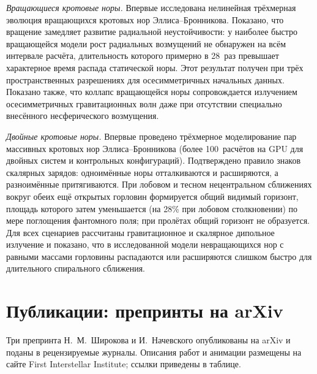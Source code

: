 \documentclass[11pt,a4paper]{article}
\begin{document}
\textit{Вращающиеся кротовые норы.} Впервые исследована нелинейная трёхмерная эволюция вращающихся кротовых нор Эллиса--Бронникова. Показано, что вращение замедляет развитие радиальной неустойчивости: у наиболее быстро вращающейся модели рост радиальных возмущений не обнаружен на всём интервале расчёта, длительность которого примерно в 28~раз превышает характерное время распада статической норы. Этот результат получен при трёх пространственных разрешениях для осесимметричных начальных данных. Показано также, что коллапс вращающейся норы сопровождается излучением осесимметричных гравитационных волн даже при отсутствии специально внесённого несферического возмущения.

\textit{Двойные кротовые норы.} Впервые проведено трёхмерное моделирование пар массивных кротовых нор Эллиса--Бронникова (более 100~расчётов на GPU для двойных систем и контрольных конфигураций). Подтверждено правило знаков скалярных зарядов: одноимённые норы отталкиваются и расширяются, а разноимённые притягиваются. При лобовом и тесном нецентральном сближениях вокруг обеих ещё открытых горловин формируется общий видимый горизонт, площадь которого затем уменьшается (на 28\% при лобовом столкновении) по мере поглощения фантомного поля; при пролётах общий горизонт не образуется. Для всех сценариев рассчитаны гравитационное и скалярное дипольное излучение и показано, что в исследованной модели невращающихся нор с равными массами горловины распадаются или расширяются слишком быстро для длительного спирального сближения.

\section*{Публикации: препринты на arXiv}

Три препринта Н.~М.~Широкова и И.~Начевского опубликованы на arXiv и поданы в рецензируемые журналы. Описания работ и анимации размещены на сайте First Interstellar Institute; ссылки приведены в таблице.
\end{document}
